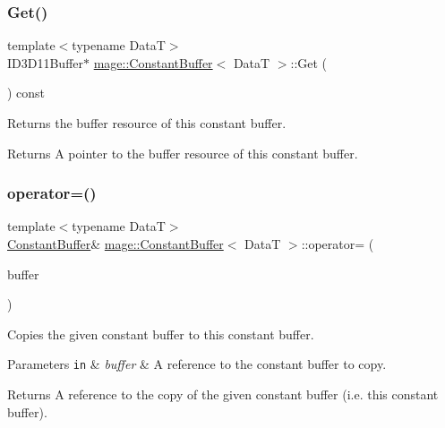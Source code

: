 \subsubsection{\texorpdfstring{Get()}{Get()}}
{\footnotesize\ttfamily template$<$typename DataT$>$ \\
I\+D3\+D11\+Buffer$\ast$ \hyperlink{structmage_1_1_constant_buffer}{mage\+::\+Constant\+Buffer}$<$ DataT $>$\+::Get (\begin{DoxyParamCaption}{ }\end{DoxyParamCaption}) const\hspace{0.3cm}{\ttfamily [noexcept]}}

Returns the buffer resource of this constant buffer.

\begin{DoxyReturn}{Returns}
A pointer to the buffer resource of this constant buffer. 
\end{DoxyReturn}
\hypertarget{structmage_1_1_constant_buffer_acb1a4f4b656073609075b5e89dea6973}{}\label{structmage_1_1_constant_buffer_acb1a4f4b656073609075b5e89dea6973} 
\subsubsection{\texorpdfstring{operator=()}{operator=()}\hspace{0.1cm}{\footnotesize\ttfamily [1/2]}}
{\footnotesize\ttfamily template$<$typename DataT$>$ \\
\hyperlink{structmage_1_1_constant_buffer}{Constant\+Buffer}\& \hyperlink{structmage_1_1_constant_buffer}{mage\+::\+Constant\+Buffer}$<$ DataT $>$\+::operator= (\begin{DoxyParamCaption}\item[{const \hyperlink{structmage_1_1_constant_buffer}{Constant\+Buffer}$<$ DataT $>$ \&}]{buffer }\end{DoxyParamCaption})\hspace{0.3cm}{\ttfamily [delete]}}

Copies the given constant buffer to this constant buffer.


\begin{DoxyParams}[1]{Parameters}
\mbox{\tt in}  & {\em buffer} & A reference to the constant buffer to copy. \\
\hline
\end{DoxyParams}
\begin{DoxyReturn}{Returns}
A reference to the copy of the given constant buffer (i.\+e. this constant buffer). 
\end{DoxyReturn}
\hypertarget{structmage_1_1_constant_buffer_ad050b1f0f03a5fcd2b51977a744781a3}{}\label{structmage_1_1_constant_buffer_ad050b1f0f03a5fcd2b51977a744781a3} 
